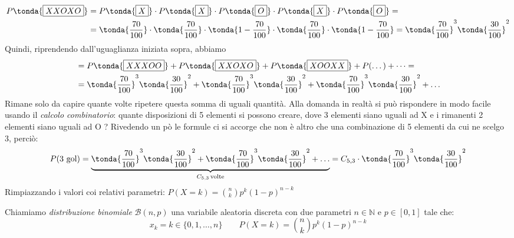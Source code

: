 \begin{esempio}
\[\begin{split}P\tonda{\text{\boxed{XXOXO}}} &= P\tonda{\text{\boxed{X}}} \cdot P\tonda{\text{\boxed{X}}} \cdot P\tonda{\text{\boxed{O}}}  \cdot P\tonda{\text{\boxed{X}}} \cdot P\tonda{\text{\boxed{O}}}=\\ &= \tonda{\dfrac{70}{100}} \cdot  \tonda{\dfrac{70}{100}} \cdot  \tonda{1-\dfrac{70}{100}}  \cdot  \tonda{\dfrac{70}{100}} \cdot \tonda{ 1-\dfrac{70}{100}} =\tonda{\dfrac{70}{100}}^3 \tonda{\dfrac{30}{100}}^2 \end{split}\]
Quindi, riprendendo dall'uguaglianza iniziata sopra, abbiamo
\[\begin{split}&= P\tonda{\text{\boxed{XXXOO}}}+P\tonda{\text{\boxed{XXOXO}}}+P\tonda{\text{\boxed{XOOXX}}}+ P(\dots)+\dots = \\ &= \tonda{\dfrac{70}{100}}^3 \tonda{\dfrac{30}{100}}^2+\tonda{\dfrac{70}{100}}^3 \tonda{\dfrac{30}{100}}^2+\tonda{\dfrac{70}{100}}^3 \tonda{\dfrac{30}{100}}^2+\dots \end{split}\]
Rimane solo da capire quante volte ripetere questa somma di uguali quantità. Alla domanda in realtà si può rispondere in modo facile usando il \emph{calcolo combinatorio}: quante disposizioni di 5 elementi si possono creare, dove 3 elementi siano uguali ad X e i rimanenti 2 elementi siano uguali ad O ? Rivedendo un pò le formule ci si accorge che non è altro che una combinazione di 5 elementi da cui ne scelgo 3, perciò:
\[P(\text{3 gol}) = \underbrace{ \tonda{\dfrac{70}{100}}^3 \tonda{\dfrac{30}{100}}^2+\tonda{\dfrac{70}{100}}^3 \tonda{\dfrac{30}{100}}^2+ \dots}_{C_{5,3} \,\text{volte}} = C_{5,3} \cdot \tonda{\dfrac{70}{100}}^3 \tonda{\dfrac{30}{100}}^2\]
Rimpiazzando i valori coi relativi parametri: \quad \( \displaystyle P(X=k)= \binom{n}{k} p^k (1-p)^{n-k}\)\end{esempio}


\begin{definizione} Chiamiamo \emph{distribuzione binomiale} $\mathcal{B}(n,p)$ una variabile aleatoria discreta con due parametri $n \in \mathbb{N}$ e $p \in [0,1]$ tale che:
\[ x_k = k \in \{0,1,\dots,n\} \qquad P(X=k)= \binom{n}{k} p^k (1-p)^{n-k}\]
\end{definizione}

